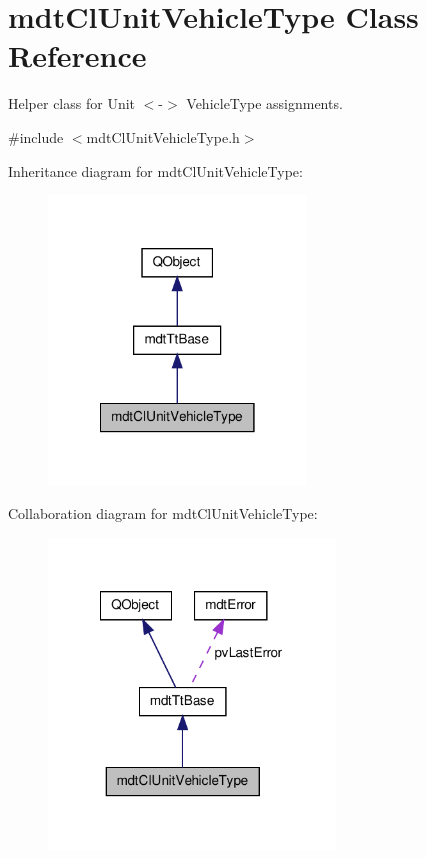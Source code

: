 \hypertarget{classmdt_cl_unit_vehicle_type}{\section{mdt\-Cl\-Unit\-Vehicle\-Type Class Reference}
\label{classmdt_cl_unit_vehicle_type}
}


Helper class for Unit $<$-\/$>$ Vehicle\-Type assignments.  




{\ttfamily \#include $<$mdt\-Cl\-Unit\-Vehicle\-Type.\-h$>$}



Inheritance diagram for mdt\-Cl\-Unit\-Vehicle\-Type\-:
\nopagebreak
\begin{figure}[H]
\begin{center}
\leavevmode
\includegraphics[width=194pt]{classmdt_cl_unit_vehicle_type__inherit__graph}
\end{center}
\end{figure}


Collaboration diagram for mdt\-Cl\-Unit\-Vehicle\-Type\-:
\nopagebreak
\begin{figure}[H]
\begin{center}
\leavevmode
\includegraphics[width=216pt]{classmdt_cl_unit_vehicle_type__coll__graph}
\end{center}
\end{figure}
